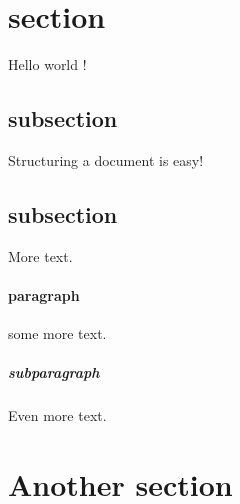 \documentclass{article}
\begin{document}
	\section{section}
	Hello world !
	\subsection{subsection}
	Structuring a document is easy!
	\subsection{subsection}
	More text.
	\paragraph{paragraph}
	some more text.
	\subparagraph{subparagraph}
	Even more text.
	\section{Another section}
\end{document}
